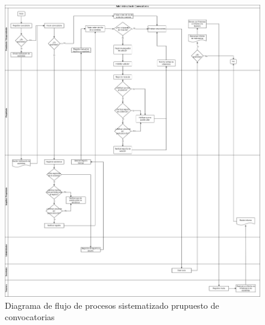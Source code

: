 \begin{itemize}
\begin{figure}[H]
        \includegraphics[width=1\textwidth]{resources/images/Diagrama de flujo convocatorias propuesto}
        \caption{Diagrama de flujo de procesos sistematizado prupuesto de convocatorias}
        \label{fig:flujo-proceso de convocatorias propuesto}
    \end{figure}



\end{itemize}
